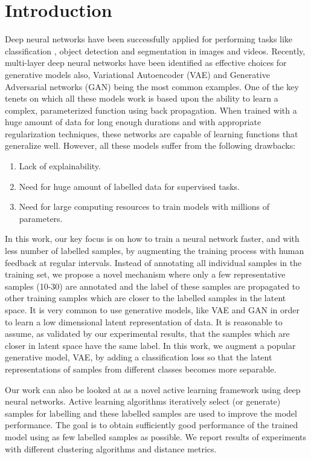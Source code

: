 \documentclass[runningheads]{llncs}
\begin{document}
\section{Introduction}
Deep neural networks have been successfully applied  for performing tasks like classification \cite{alexnet,vggnet,resnet}, object detection \cite{faster_rcnn,yolo} and segmentation \cite{deeplab,unet} in images and videos.
Recently, multi-layer deep neural networks have been identified as  effective  choices for  generative models also, Variational Autoencoder (VAE) \cite{vae} and Generative Adversarial networks (GAN) \cite{gan} being the most common examples.
One of the key tenets on which all these models work is  based upon the ability to learn a complex, parameterized function using back propagation.
When trained with a huge amount of data for long enough durations and with appropriate regularization techniques, these networks are capable of learning functions that generalize well.
However, all these  models suffer from the following drawbacks:
\begin{enumerate}
  \item Lack of explainability.
  \item Need for huge amount of labelled data for supervised tasks.
  \item Need for large computing resources to train models with millions of parameters.
\end{enumerate}

In this work, our key focus is on how to train a neural network faster, and with less number of labelled samples, by augmenting the training process with human feedback at regular intervals.
Instead of annotating all individual samples in the training set, we propose a novel mechanism where only a few representative samples (10-30) are annotated and the label of these samples are propagated to other training samples  which are closer to the labelled samples in the latent space.
It is very common to use  generative models, like VAE \cite{vae} and GAN\cite{gan} in order to learn a low dimensional latent representation of data.
It is reasonable to assume, as validated by our experimental results, that the samples which are closer in latent space have the same label.
In this work, we augment a popular generative model, VAE,  by adding a classification loss so that the latent representations of samples from different classes becomes more separable.

Our work can also be looked at  as a novel  active learning framework using deep neural networks.
Active learning algorithms iteratively select (or generate) samples for labelling and these labelled samples are used to improve the model performance.
The goal is to obtain sufficiently good performance of the trained model using as few labelled samples as possible.
We report results of experiments with different clustering algorithms and distance metrics.
\end{document}
